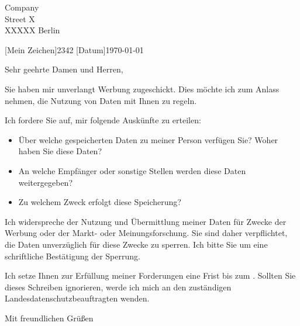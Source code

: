 \documentclass[briefvorlage,
   parskip=half,%
   fromfax=on,%
   fromemail=on,%
   locfield=wide,%
   draft=false%
]{scrlttr2}
\begin{document}
 \begin{letter}{
Company\\
Street X\\
XXXXX Berlin}


[\normalfont Mein Zeichen]{2342}
[\normalfont Datum]{\today}
\opening{Sehr geehrte Damen und Herren,}

Sie haben mir unverlangt Werbung zugeschickt. Dies möchte ich zum Anlass nehmen, die Nutzung von Daten mit Ihnen zu regeln.

Ich fordere Sie auf, mir folgende Auskünfte zu erteilen:

\begin{itemize}
\item Über welche gespeicherten Daten zu meiner Person verfügen Sie? Woher haben Sie diese Daten?

\item An welche Empfänger oder sonstige Stellen werden diese Daten weitergegeben?

\item Zu welchem Zweck erfolgt diese Speicherung?

\end{itemize}

Ich widerspreche der Nutzung und Übermittlung meiner Daten für Zwecke der Werbung oder der Markt- oder Meinungsforschung. Sie sind daher verpflichtet, die Daten unverzüglich für diese Zwecke zu sperren. Ich bitte Sie um eine schriftliche Bestätigung der Sperrung.

Ich setze Ihnen zur Erfüllung meiner Forderungen eine Frist bis zum \DayAfter[21]. Sollten Sie dieses Schreiben ignorieren, werde ich mich an den zuständigen Landesdatenschutzbeauftragten wenden.

\closing{Mit freundlichen Grüßen}
\end{letter}

 
\end{document}
